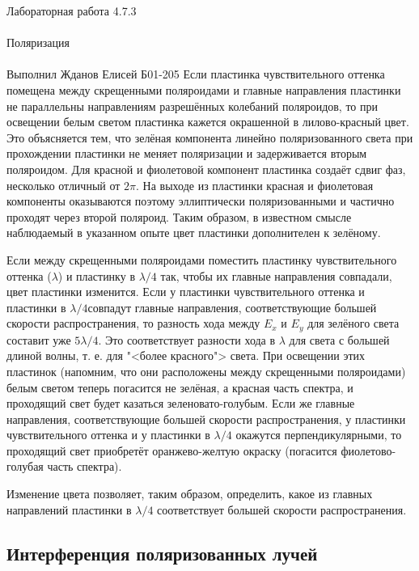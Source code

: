 \documentclass{astroedu-lab}
\begin{document}
\begin{problem}{\huge Лабораторная работа 4.7.3\\\\Поляризация\\\\Выполнил Жданов Елисей Б01-205}
Если пластинка чувствительного оттенка помещена между скрещенными поляроидами и главные направления пластинки не параллельны
направлениям разрешённых колебаний поляроидов, то при освещении
белым светом пластинка кажется окрашенной в лилово-красный цвет.
Это объясняется тем, что зелёная компонента линейно поляризованного света при прохождении пластинки не меняет поляризации и задерживается вторым поляроидом. Для красной и фиолетовой компонент
пластинка создаёт сдвиг фаз, несколько отличный от $ 2\pi $. На выходе
из пластинки красная и фиолетовая компоненты оказываются поэтому
эллиптически поляризованными и частично проходят через второй поляроид. Таким образом, в известном смысле наблюдаемый в указанном
опыте цвет пластинки дополнителен к зелёному.

Если между скрещенными поляроидами поместить пластинку чувствительного оттенка
($ \lambda $) и пластинку в $ \lambda/4 $ так, чтобы их главные
направления совпадали, цвет пластинки изменится. Если у пластинки чувствительного оттенка и пластинки в $ \lambda/4  $совпадут главные направления, соответствующие большей скорости распространения, то разность хода между $ E_x $ и $ E_y $ для зелёного света составит уже $ 5\lambda/4 $. Это соответствует разности хода в $ \lambda $ для света с большей длиной волны, т. е. для "<более красного"> света. При освещении
этих пластинок (напомним, что они расположены между скрещенными поляроидами) белым светом теперь погасится не зелёная, а красная
часть спектра, и проходящий свет будет казаться зеленовато-голубым.
Если же главные направления, соответствующие большей скорости распространения, у пластинки чувствительного оттенка и у пластинки
в $ \lambda/4 $ окажутся перпендикулярными, то проходящий свет приобретёт
оранжево-желтую окраску (погасится фиолетово-голубая часть спектра).

Изменение цвета позволяет, таким образом, определить, какое из
главных направлений пластинки в $ \lambda/4 $ соответствует большей скорости распространения.

\subsection{Интерференция поляризованных лучей}


\end{problem}
\end{document}
